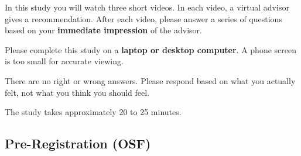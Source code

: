 \documentclass[11pt, a4paper]{article}
\begin{document}
\begin{infobox}
\small
In this study you will watch three short videos. In each video, a virtual advisor gives a recommendation. After each video, please answer a series of questions based on your \textbf{immediate impression} of the advisor.

Please complete this study on a \textbf{laptop or desktop computer}. A phone screen is too small for accurate viewing.

There are no right or wrong answers. Please respond based on what you actually felt, not what you think you should feel.

The study takes approximately 20 to 25 minutes.
\end{infobox}

\subsection{Pre-Registration (OSF)}
\end{document}
